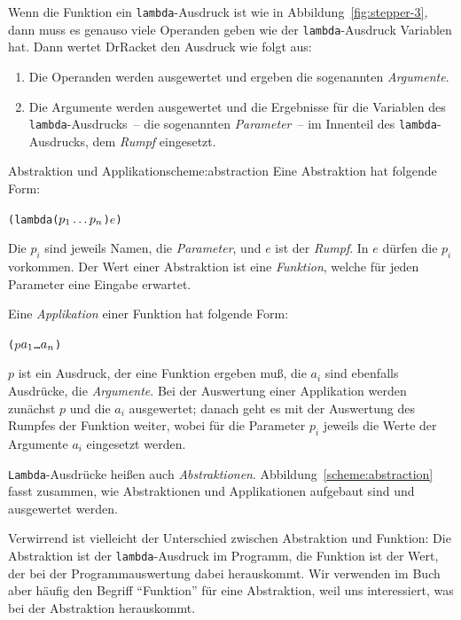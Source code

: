 Wenn die Funktion ein \texttt{lambda}-Ausdruck ist wie in
Abbildung~\ref{fig:stepper-3}, dann muss es genauso viele Operanden
geben wie der \texttt{lambda}-Ausdruck Variablen hat.
Dann wertet DrRacket den Ausdruck wie folgt aus:
%
\begin{enumerate}
\item Die Operanden werden ausgewertet und ergeben die sogenannten
  \textit{Argumente}.
\item Die Argumente werden ausgewertet und die Ergebnisse für die
  Variablen des \texttt{lambda}-Ausdrucks~-- die sogenannten
  \textit{Parameter}~-- im Innenteil des
  \texttt{lambda}-Ausdrucks, dem \textit{Rumpf}
  eingesetzt.
\end{enumerate}
%
\begin{feature}{Abstraktion und Applikation}{scheme:abstraction}
  Eine Abstraktion hat folgende Form:
\begin{alltt}
(lambda (\(p\sb{1} \ldots p\sb{n}\)) \(e\))
\end{alltt}
  Die $p_i$ sind jeweils Namen, die \textit{Parameter}, und
  $e$ ist der \textit{Rumpf}.  In $e$ dürfen die $p_i$
  vorkommen.  Der Wert einer Abstraktion ist eine \textit{Funktion},
  welche für jeden Parameter eine Eingabe erwartet.

  Eine \textit{Applikation} einer Funktion hat folgende Form:
\begin{alltt}
(\(p\) \(a\sb{1}\) \ldots \(a\sb{n}\))
\end{alltt}
  $p$ ist ein Ausdruck, der eine Funktion ergeben muß, die $a_i$ sind
  ebenfalls Ausdrücke, die \textit{Argumente}.  Bei
  der Auswertung einer Applikation werden zunächst $p$ und die $a_i$
  ausgewertet; danach geht es mit der Auswertung des Rumpfes der
  Funktion weiter, wobei für die Parameter $p_i$ jeweils die Werte der
  Argumente $a_i$ eingesetzt werden.
\end{feature}
%
\texttt{Lambda}-Ausdrücke heißen auch
\textit{Abstraktionen}.
Abbildung~\ref{scheme:abstraction} fasst zusammen, wie Abstraktionen
und Applikationen aufgebaut sind und ausgewertet werden.

Verwirrend ist vielleicht der Unterschied zwischen Abstraktion und
Funktion: Die Abstraktion ist der \texttt{lambda}-Ausdruck im
Programm, die Funktion ist der Wert, der bei der Programmauswertung
dabei herauskommt.  Wir verwenden im Buch aber häufig den Begriff
"`Funktion"' für eine Abstraktion, weil uns interessiert, was bei der
Abstraktion herauskommt.

